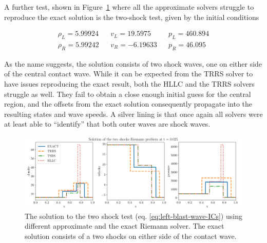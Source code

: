 A further test, shown in Figure~\ref{fig:approximate-riemann-two-shocks} where all the approximate
solvers struggle to reproduce the exact solution is the two-shock test, given by the initial
conditions

\begin{align}
    \rho_L = 5.99924 && v_L = 19.5975 && p_L = 460.894 \label{eq:two-shock-ICs} \\
    \rho_R = 5.99242 && v_R = -6.19633 && p_R = 46.095      \nonumber
\end{align}

As the name suggests, the solution consists of two shock waves, one on either side of the central
contact wave. While it can be expected from the TRRS solver to have issues reproducing the exact
result, both the HLLC and the TRRS solvers struggle as well. They fail to obtain a close enough
initial guess for the central region, and the offsets from the exact solution consequently
propagate into the resulting states and wave speeds. A silver lining is that once again all solvers
were at least able to ``identify'' that both outer waves are shock waves.

\begin{figure}
\centering
\includegraphics[width=\textwidth]{
./figures/FV/approximate_riemann_solvers/riemann-approximate-two_shocks-0.025.png} %
\caption[Two shocks solution with approximate Riemann solvers]{
    The solution to the two shock test (eq. \ref{eq:left-blast-wave-ICs}) using different
    approximate and the exact Riemann solver. The exact solution consists of a two shocks on either
    side of the contact wave.
    }%
    \label{fig:approximate-riemann-two-shocks}
\end{figure}


